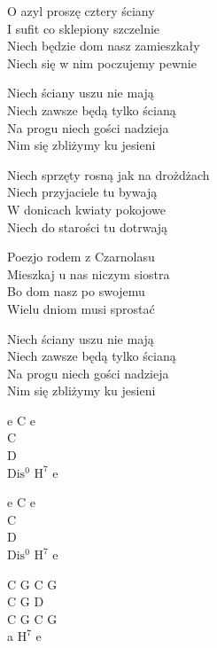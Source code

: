 \begin{text}
    O azyl proszę cztery ściany\\
    I sufit co sklepiony szczelnie\\
    Niech będzie dom nasz zamieszkały\\
    Niech się w nim poczujemy pewnie

    Niech ściany uszu nie mają\\
    Niech zawsze będą tylko ścianą\\
    Na progu niech gości nadzieja\\
    Nim się zbliżymy ku jesieni

    \vin Niech sprzęty rosną jak na drożdżach\\
    \vin Niech przyjaciele tu bywają\\
    \vin W donicach kwiaty pokojowe\\
    \vin Niech do starości tu dotrwają

    Poezjo rodem z Czarnolasu\\
    Mieszkaj u nas niczym siostra\\
    Bo dom nasz po swojemu\\
    Wielu dniom musi sprostać

    Niech ściany uszu nie mają\\
    Niech zawsze będą tylko ścianą\\
    Na progu niech gości nadzieja\\
    Nim się zbliżymy ku jesieni
\end{text}
\begin{chord}
    e C e\\
    C\\
    D\\
    $\mathrm{Dis^{0}}$ $\mathrm{H^{7}}$ e

    e C e\\
    C\\
    D\\
    $\mathrm{Dis^{0}}$ $\mathrm{H^{7}}$ e

    C G C G\\
    C G D\\
    C G C G\\
    a $\mathrm{H^{7}}$ e

\end{chord}
